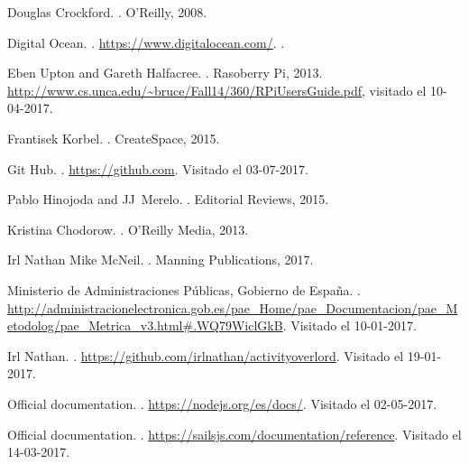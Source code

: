 \documentclass[xcolor=x11names,compress]{beamer}
\theoremstyle{cuadrado}
\begin{document}
{{\begin{thebibliography}{8}
\color{black}
Douglas Crockford.
.
\newblock O'Reilly, 2008.

\color{black}
{Digital Ocean}.
.
\newblock \url{https://www.digitalocean.com/}.
.

\color{black}
{Eben Upton and Gareth Halfacree}.
.
\newblock Rasoberry Pi, 2013.
\newblock \url{http://www.cs.unca.edu/~bruce/Fall14/360/RPiUsersGuide.pdf},
  visitado el 10-04-2017.

\color{black}
{Frantisek Korbel}.
.
\newblock CreateSpace, 2015.

\color{black}
{Git Hub}.
.
\newblock \url{https://github.com}.
\newblock Visitado el 03-07-2017.

\color{black}
Pablo Hinojoda and JJ~Merelo.
.
\newblock Editorial Reviews, 2015.

\color{black}
{Kristina Chodorow}.
.
\newblock O'Reilly Media, 2013.

\color{black}
{Irl Nathan} {Mike McNeil}.
.
\newblock Manning Publications, 2017.

\color{black}
{Ministerio de Administraciones Públicas, Gobierno de España}.
.
\newblock
  \url{http://administracionelectronica.gob.es/pae_Home/pae_Documentacion/pae_Metodolog/pae_Metrica_v3.html#.WQ79WiclGkB}.
\newblock Visitado el 10-01-2017.

\color{black}
Irl Nathan.
.
\newblock \url{https://github.com/irlnathan/activityoverlord}.
\newblock Visitado el 19-01-2017.

\color{black}
{Official documentation}.
.
\newblock \url{https://nodejs.org/es/docs/}.
\newblock Visitado el 02-05-2017.

\color{black}
{Official documentation}.
.
\newblock \url{https://sailsjs.com/documentation/reference}.
\newblock Visitado el 14-03-2017.


\end{thebibliography}}}
\end{document}
